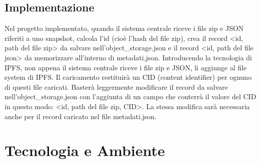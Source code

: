 \subsection{Implementazione}
Nel progetto implementato, quando il sistema centrale riceve i file zip e JSON riferiti a uno snapshot, calcola l'id (cioè l'hash del file zip), crea il record <id, path del file zip> da salvare nell'object\_storage.json e il record <id, path del file json> da memorizzare all'interno di metadati.json. Introducendo la tecnologia di IPFS, non appena il sistema centrale riceve i file zip e JSON, li aggiunge al file system di IPFS. Il caricamento restituirà un CID (content identifier) per ognuno di questi file caricati. Basterà leggermente modificare il record da salvare nell'object\_storage.json con l'aggiunta di un campo che conterrà il valore del CID in questo modo: <id, path del file zip, CID>. La stessa modifica sarà necessaria anche per il record  caricato nel file metadati.json.

\section{Tecnologia e Ambiente}
